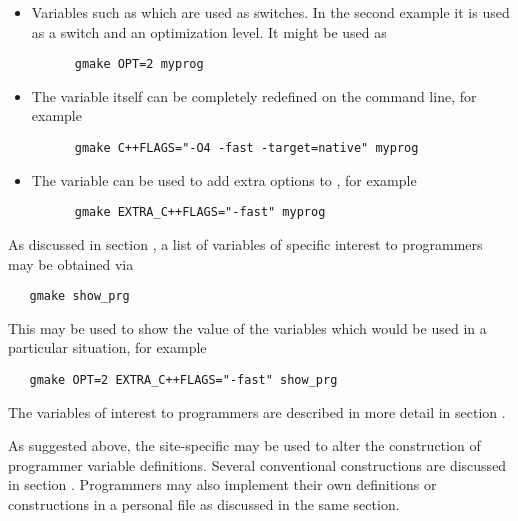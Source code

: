 \begin{itemize}
\item
   Variables such as  which are used as switches.  In the second
   example it is used as a switch and an optimization level.  It might be used
   as

   \begin{verbatim}
      gmake OPT=2 myprog
   \end{verbatim}

\item
   The  variable itself can be completely redefined on the
   command line, for example

   \begin{verbatim}
      gmake C++FLAGS="-O4 -fast -target=native" myprog
   \end{verbatim}

\item
   The  variable can be used to add extra options to
   , for example
 
   \begin{verbatim}
      gmake EXTRA_C++FLAGS="-fast" myprog
   \end{verbatim}

\end{itemize}

\noindent
As discussed in section , a list of variables
of specific interest to programmers may be obtained via

\begin{verbatim}
   gmake show_prg
\end{verbatim}

\noindent
This may be used to show the value of the variables which would be used in a
particular situation, for example

\begin{verbatim}
   gmake OPT=2 EXTRA_C++FLAGS="-fast" show_prg
\end{verbatim}

\noindent
The variables of interest to programmers are described in more detail in
section .

As suggested above, the site-specific  may be used to alter
the construction of programmer variable definitions.  Several conventional
constructions are discussed in section .  Programmers may also implement their own definitions or
constructions in a personal  file as discussed in the same
section.

